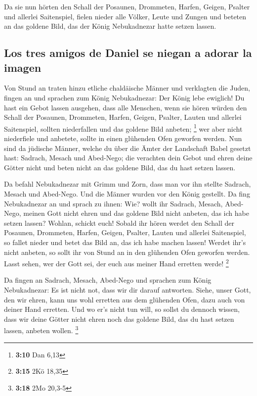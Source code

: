  Da sie nun hörten den Schall der Posaunen, Drommeten,
Harfen, Geigen, Psalter und allerlei Saitenspiel, fielen nieder alle
Völker, Leute und Zungen und beteten an das goldene Bild, das der König
Nebukadnezar hatte setzen lassen.

\hypertarget{los-tres-amigos-de-daniel-se-niegan-a-adorar-la-imagen}{%
\subsection{Los tres amigos de Daniel se niegan a adorar la
imagen}\label{los-tres-amigos-de-daniel-se-niegan-a-adorar-la-imagen}}

 Von Stund an traten hinzu etliche chaldäische Männer und
verklagten die Juden,  fingen an und sprachen zum König
Nebukadnezar: Der König lebe ewiglich!  Du hast ein Gebot
lassen ausgehen, dass alle Menschen, wenn sie hören würden den Schall
der Posaunen, Drommeten, Harfen, Geigen, Psalter, Lauten und allerlei
Saitenspiel, sollten niederfallen und das goldene Bild anbeten;
\footnote{\textbf{3:10} Dan 6,13}  wer aber nicht
niederfiele und anbetete, sollte in einen glühenden Ofen geworfen
werden.  Nun sind da jüdische Männer, welche du über die
Ämter der Landschaft Babel gesetzt hast: Sadrach, Mesach und Abed-Nego;
die verachten dein Gebot und ehren deine Götter nicht und beten nicht an
das goldene Bild, das du hast setzen lassen.

 Da befahl Nebukadnezar mit Grimm und Zorn, dass man vor
ihn stellte Sadrach, Mesach und Abed-Nego. Und die Männer wurden vor den
König gestellt.  Da fing Nebukadnezar an und sprach zu
ihnen: Wie? wollt ihr Sadrach, Mesach, Abed-Nego, meinen Gott nicht
ehren und das goldene Bild nicht anbeten, das ich habe setzen lassen?
 Wohlan, schickt euch! Sobald ihr hören werdet den Schall
der Posaunen, Drommeten, Harfen, Geigen, Psalter, Lauten und allerlei
Saitenspiel, so fallet nieder und betet das Bild an, das ich habe machen
lassen! Werdet ihr's nicht anbeten, so sollt ihr von Stund an in den
glühenden Ofen geworfen werden. Lasst sehen, wer der Gott sei, der euch
aus meiner Hand erretten werde! \footnote{\textbf{3:15} 2Kö 18,35}

 Da fingen an Sadrach, Mesach, Abed-Nego und sprachen zum
König Nebukadnezar: Es ist nicht not, dass wir dir darauf antworten.
 Siehe, unser Gott, den wir ehren, kann uns wohl erretten
aus dem glühenden Ofen, dazu auch von deiner Hand erretten.
 Und wo er's nicht tun will, so sollst du dennoch wissen,
dass wir deine Götter nicht ehren noch das goldene Bild, das du hast
setzen lassen, anbeten wollen. \footnote{\textbf{3:18} 2Mo 20,3-5}

